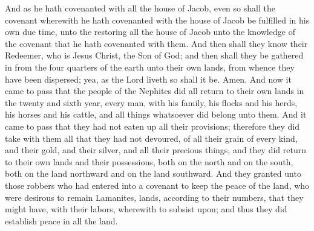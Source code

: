 And as he hath covenanted with all the house of Jacob, even so shall the covenant wherewith he hath covenanted with the house of Jacob be fulfilled in his own due time, unto the restoring all the house of Jacob unto the knowledge of the covenant that he hath covenanted with them.
\bverse \iffalse And then shall they know their Redeemer, who is Jesus Christ, the Son of God; and then shall they be gathered in from the four quarters of the earth unto their own lands, from whence they have been dispersed; yea, as the Lord liveth so shall it be. Amen. \fi
And then shall they know their Redeemer, who is Jesus Christ, the Son of God; and then shall they be gathered in from the four quarters of the earth unto their own lands, from whence they have been dispersed; yea, as the Lord liveth so shall it be. Amen.
\bchapter
\bverse \iffalse And now it came to pass that the people of the Nephites did all return to their own lands in the twenty and sixth year, every man, with his family, his flocks and his herds, his horses and his cattle, and all things whatsoever did belong unto them. \fi
And now it came to pass that the people of the Nephites did all return to their own lands in the twenty and sixth year, every man, with his family, his flocks and his herds, his horses and his cattle, and all things whatsoever did belong unto them.
\bverse \iffalse And it came to pass that they had not eaten up all their provisions; therefore they did take with them all that they had not devoured, of all their grain of every kind, and their gold, and their silver, and all their precious things, and they did return to their own lands and their possessions, both on the north and on the south, both on the land northward and on the land southward. \fi
And it came to pass that they had not eaten up all their provisions; therefore they did take with them all that they had not devoured, of all their grain of every kind, and their gold, and their silver, and all their precious things, and they did return to their own lands and their possessions, both on the north and on the south, both on the land northward and on the land southward.
\bverse \iffalse And they granted unto those robbers who had entered into a covenant to keep the peace of the land, who were desirous to remain Lamanites, lands, according to their numbers, that they might have, with their labors, wherewith to subsist upon; and thus they did establish peace in all the land. \fi
And they granted unto those robbers who had entered into a covenant to keep the peace of the land, who were desirous to remain Lamanites, lands, according to their numbers, that they might have, with their labors, wherewith to subsist upon; and thus they did establish peace in all the land.
